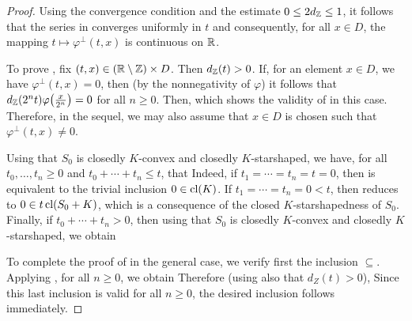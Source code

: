 \begin{proof} Using the convergence condition  and the estimate $0\leq 2d_{\mathbb{Z}}\leq1$, it follows that the series 
in  converges uniformly in $t$ and consequently, for all $x\in D$, the mapping $t\mapsto\varphi^\perp(t,x)$ is 
continuous on $\mathbb{R}$.

To prove , fix $(t,x)\in(\mathbb{R}\setminus\mathbb{Z})\times D$. Then $d_{\mathbb{Z}}(t)>0$.
If, for an element $x\in D$, we have $\varphi^\perp(t,x)=0$, then (by the nonnegativity of $\varphi$) it follows that
$d_{\mathbb{Z}}(2^nt)\varphi\big(\frac{x}{2^n}\big)=0$ for all $n\geq0$. Then,
which shows the validity of  in this case. 
Therefore, in the sequel, we may also assume that $x\in D$ is chosen such that $\varphi^\perp(t,x)\neq0$.

Using that $S_0$ is closedly $K$-convex and closedly $K$-starshaped, we have, for all $t_0,\dots,t_n\geq0$ and 
$t_0+\cdots+t_n\leq t$, that
Indeed, if $t_1=\cdots=t_n=t=0$, then  is equivalent to the trivial inclusion $0\in\mathop{\hbox{\rm cl}}\nolimits(K)$. 
If $t_1=\cdots=t_n=0<t$, then  reduces to $0\in t\mathop{\hbox{\rm cl}}\nolimits(S_0+K)$, which is a consequence of the closed 
$K$-starshapedness of $S_0$. Finally, if $t_0+\cdots+t_n>0$, then using that $S_0$ is closedly $K$-convex and closedly 
$K$-starshaped, we obtain

To complete the proof of  in the general case, we verify first the inclusion $\subseteq$.
Applying , for all $n\geq 0$, we obtain 
Therefore (using also that $d_Z(t)>0$),
Since this last inclusion is valid for all $n\geq0$, the desired inclusion follows immediately. 


\end{proof}
